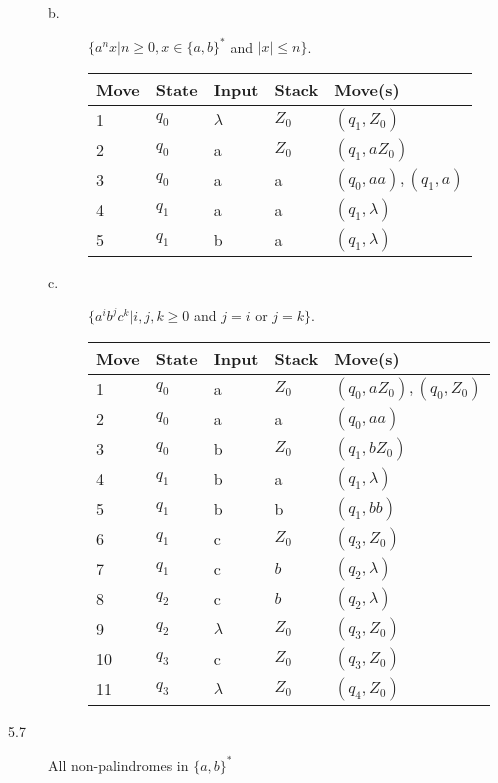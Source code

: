 \documentclass{article}
\begin{document}
\begin{description}
\begin{description}
  \item[b.]
    $\{a^n x | n \ge 0, x \in \{a,b\}^*$ and $|x| \le n\}$.
    \begin{center}
      \begin{tabular}{|l|l|l|l|l|}
        \hline
        Move & State & Input & Stack & Move(s)\\
        \hline
        1 & $q_0$ & $\lambda$ & $Z_0$ & $(q_1,Z_0)$\\
        2 & $q_0$ & a & $Z_0$ & $(q_1,aZ_0)$\\
        3 & $q_0$ & a & a & $(q_0,aa), (q_1,a)$\\
        4 & $q_1$ & a & a & $(q_1,\lambda)$\\
        5 & $q_1$ & b & a & $(q_1,\lambda)$\\
        \hline
      \end{tabular}
    \end{center}
  \item[c.]
    $\{a^i b^j c^k | i,j,k \ge 0$ and $j=i$ or $j = k\}$.
    \begin{center}
      \begin{tabular}{|lllll|}
        \hline
        Move & State & Input & Stack & Move(s)\\
        \hline
        1 & $q_0$ & a & $Z_0$ & $(q_0, aZ_0), (q_0, Z_0)$\\
        2 & $q_0$ & a & a & $(q_0, aa)$\\
        3 & $q_0$ & b & $Z_0$ & $(q_1, bZ_0)$\\
        4 & $q_1$ & b & a & $(q_1, \lambda)$\\
        5 & $q_1$ & b & b & $(q_1, bb)$\\
        6 & $q_1$ & c & $Z_0$ & $(q_3, Z_0)$\\
        7 & $q_1$ & c & $b$ & $(q_2, \lambda)$\\
        8 & $q_2$ & c & $b$ & $(q_2, \lambda)$\\
        9 & $q_2$ & $\lambda$ & $Z_0$ & $(q_3, Z_0)$\\
        10 & $q_3$ & c & $Z_0$ & $(q_3, Z_0)$\\
        11 & $q_3$ & $\lambda$ & $Z_0$ & $(q_4, Z_0)$\\
        \hline
      \end{tabular}
    \end{center}
  \end{description}

\item[5.7]
  All non-palindromes in $\{a,b\}^*$
\end{description}
\end{document}
